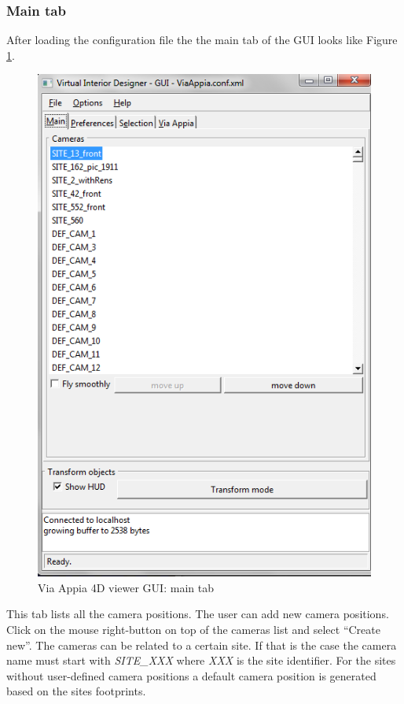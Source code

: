 \documentclass[a4paper,11pt]{article}
\begin{document}
\subsubsection{Main tab}

After loading the configuration file the the main tab of the GUI looks like Figure \ref{fig-guimain}. 

\begin{figure}[!ht]
\centering
\includegraphics[scale=0.5]{fig/main}
\caption{Via Appia 4D viewer GUI: main tab}
\label{fig-guimain}
\end{figure}

This tab lists all the camera positions. The user can add new camera positions. Click on the mouse right-button on top of the cameras list and select ``Create new''. The cameras can be related to a certain site. If that is the case the camera name must start with \textit{SITE\_XXX} where \textit{XXX} is the site identifier. For the sites without user-defined camera positions a default camera position is generated based on the sites footprints.
\end{document}

